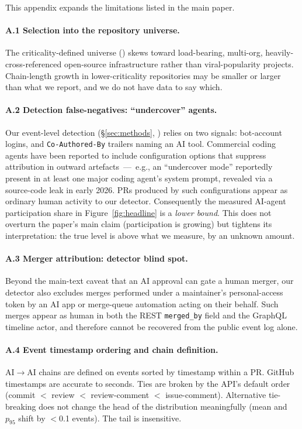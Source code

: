 
This appendix expands the limitations listed in the main paper.

\paragraph{A.1 Selection into the repository universe.}
The criticality-defined universe () skews toward load-bearing, multi-org, heavily-cross-referenced open-source infrastructure rather than viral-popularity projects. Chain-length growth in lower-criticality repositories may be smaller or larger than what we report, and we do not have data to say which.

\paragraph{A.2 Detection false-negatives: ``undercover'' agents.}
Our event-level detection (\S\ref{sec:methods}, ) relies on two signals: bot-account logins, and \texttt{Co-Authored-By} trailers naming an AI tool. Commercial coding agents have been reported to include configuration options that suppress attribution in outward artefacts~---~e.g., an ``undercover mode'' reportedly present in at least one major coding agent's system prompt, revealed via a source-code leak in early 2026. PRs produced by such configurations appear as ordinary human activity to our detector. Consequently the measured AI-agent participation share in Figure~\ref{fig:headline} is a \emph{lower bound}. This does not overturn the paper's main claim (participation is growing) but tightens its interpretation: the true level is above what we measure, by an unknown amount.

\paragraph{A.3 Merger attribution: detector blind spot.}
Beyond the main-text caveat that an AI approval can gate a human merger, our detector also excludes merges performed under a maintainer's personal-access token by an AI app or merge-queue automation acting on their behalf. Such merges appear as human in both the REST \texttt{merged\_by} field and the GraphQL timeline actor, and therefore cannot be recovered from the public event log alone.

\paragraph{A.4 Event timestamp ordering and chain definition.}
AI$\to$AI chains are defined on events sorted by timestamp within a PR. GitHub timestamps are accurate to seconds. Ties are broken by the API's default order (commit $<$ review $<$ review-comment $<$ issue-comment). Alternative tie-breaking does not change the head of the distribution meaningfully (mean and $p_{95}$ shift by $<$0.1 events). The tail is insensitive.

